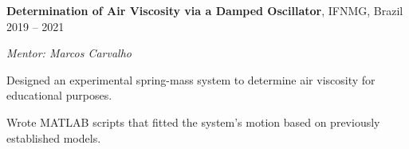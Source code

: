 \begin{entry}
	{{\bf Determination of Air Viscosity via a Damped Oscillator}, IFNMG, Brazil}
	{2019 -- 2021}
	
	{\em Mentor: Marcos Carvalho}

	Designed an experimental spring-mass system to determine air viscosity for educational purposes.

	Wrote MATLAB scripts that fitted the system's motion based on previously established models.
\end{entry}
